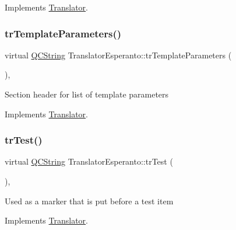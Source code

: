 Implements \mbox{\hyperlink{class_translator}{Translator}}.

\mbox{\label{class_translator_esperanto_a93ee32cd327e2c858892d3068f628bb5}} 
\subsubsection{\texorpdfstring{trTemplateParameters()}{trTemplateParameters()}}
{\footnotesize\ttfamily virtual \mbox{\hyperlink{class_q_c_string}{Q\+C\+String}} Translator\+Esperanto\+::tr\+Template\+Parameters (\begin{DoxyParamCaption}{ }\end{DoxyParamCaption})\hspace{0.3cm}{\ttfamily [inline]}, {\ttfamily [virtual]}}

Section header for list of template parameters 

Implements \mbox{\hyperlink{class_translator}{Translator}}.

\mbox{\label{class_translator_esperanto_adb6d0fb6fd2f3112a0ed1662ebf8be29}} 
\subsubsection{\texorpdfstring{trTest()}{trTest()}}
{\footnotesize\ttfamily virtual \mbox{\hyperlink{class_q_c_string}{Q\+C\+String}} Translator\+Esperanto\+::tr\+Test (\begin{DoxyParamCaption}{ }\end{DoxyParamCaption})\hspace{0.3cm}{\ttfamily [inline]}, {\ttfamily [virtual]}}

Used as a marker that is put before a test item 

Implements \mbox{\hyperlink{class_translator}{Translator}}.

\mbox{\label{class_translator_esperanto_a27ad64bb9dc23c6c225bab7864377926}} 
